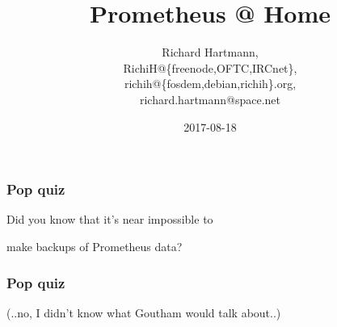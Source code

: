 \documentclass[t]{beamer}
\title{Prometheus @ Home}
\author{Richard Hartmann,\\
RichiH@\{freenode,OFTC,IRCnet\},\\
richih@\{fosdem,debian,richih\}.org,\\
richard.hartmann@space.net}
\date{2017-08-18}
\begin{document}
\setcounter{tocdepth}{1}



\begin{frame}
	\titlepage
\end{frame}






\begin{frame}
	\frametitle{Pop quiz}
	\vfill
	\centerline{Did you know that it's near impossible to}
	\centerline{make backups of Prometheus data?}
	\vfill
\end{frame}

\begin{frame}
	\frametitle{Pop quiz}
	\vfill
	\centerline{(..no, I didn't know what Goutham would talk about..)}
	\vfill
\end{frame}
\end{document}
